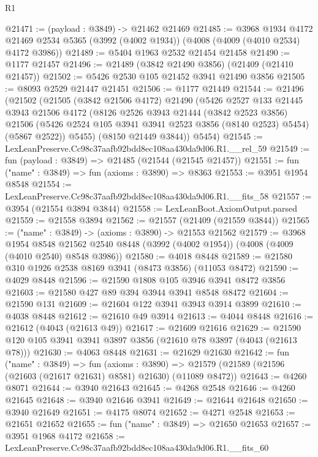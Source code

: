 \begin{lexlean}{R1}
\begin{coremodule}
@21471 := (payload : @3849) -> @21462 @21469
@21485 := @3968
    @1934
    @4172
    @21469
    @2534
    @5365
    (@3992 (@4002 @1934))
    (@4008 (@4009 (@4010 @2534) @4172 @3986))
@21489 := @5404 @1963 @2532 @21454 @21458
@21490 := @1177 @21457
@21496 := @21489 (@3842 @21490 @3856) (@21409 (@21410 @21457))
@21502 := @5426 @2530 @105 @21452 @3941 @21490 @3856
@21505 := @8093 @2529 @21447 @21451
@21506 := @1177 @21449
@21544 := @21496
    (@21502
      (@21505
        (@3842 @21506 @4172)
        @21490
        (@5426
          @2527
          @133
          @21445
          @3943
          @21506
          @4172
          (@8126
            @2526
            @3943
            @21444
            (@3842 @2523 @3856)
            @21506
            (@5426 @2524 @105 @3941 @3941 @2523 @3856 (@8140 @2523) @5454)
            (@5867 @2522))
          @5455)
        (@8150 @21449 @3844))
      @5454)
@21545 := LexLeanPreserve.Cc98c37aafb92bdd8ec108aa430da9d06.R1.__rel_59
@21549 := fun (payload : @3849) => @21485 (@21544 (@21545 @21457))
@21551 := fun ("name" : @3849) => fun (axioms : @3890) => @8363
@21553 := @3951 @1954 @8548
@21554 := LexLeanPreserve.Cc98c37aafb92bdd8ec108aa430da9d06.R1.__fits_58
@21557 := @3954 (@21554 @3894 @3844)
@21558 := LexLeanBoot.AxiomOutput.parsed
@21559 := @21558 @3894
@21562 := @21557 (@21409 (@21559 @3844))
@21565 := ("name" : @3849) -> (axioms : @3890) -> @21553 @21562
@21579 := @3968
    @1954
    @8548
    @21562
    @2540
    @8448
    (@3992 (@4002 @1954))
    (@4008 (@4009 (@4010 @2540) @8548 @3986))
@21580 := @4018 @8448
@21589 := @21580 @310 @1926 @2538 @8169 @3941 (@8473 @3856) (@11053 @8472)
@21590 := @4029 @8448
@21596 := @21590 @1808 @105 @3946 @3941 @8472 @3856
@21603 := @21580 @427 @89 @394 @3944 @3941 @8548 @8472
@21604 := @21590 @131
@21609 := @21604 @122 @3941 @3943 @3914 @3899
@21610 := @4038 @8448
@21612 := @21610 @49 @3914
@21613 := @4044 @8448
@21616 := @21612 (@4043 (@21613 @49))
@21617 := @21609 @21616
@21629 := @21590 @120 @105 @3941 @3941 @3897 @3856 (@21610 @78 @3897 (@4043 (@21613 @78)))
@21630 := @4063 @8448
@21631 := @21629 @21630
@21642 := fun ("name" : @3849) =>
  fun (axioms : @3890) =>
  @21579 (@21589 (@21596 (@21603 (@21617 @21631) @8581) @21630) (@11089 @8472))
@21643 := @4260 @8071
@21644 := @3940 @21643
@21645 := @4268 @2548
@21646 := @4260 @21645
@21648 := @3940 @21646 @3941
@21649 := @21644 @21648
@21650 := @3940 @21649
@21651 := @4175 @8074
@21652 := @4271 @2548
@21653 := @21651 @21652
@21655 := fun ("name" : @3849) => @21650 @21653
@21657 := @3951 @1968 @4172
@21658 := LexLeanPreserve.Cc98c37aafb92bdd8ec108aa430da9d06.R1.__fits_60

\end{coremodule}
\end{lexlean}
